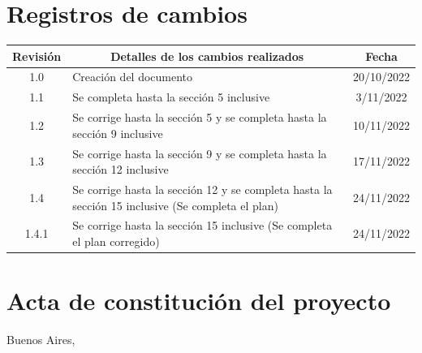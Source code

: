 \documentclass[
11pt, %
]{charter}
\begin{document}
\maketitle
\thispagestyle{empty}
\pagebreak


\thispagestyle{empty}
{\setlength{\parskip}{0pt}
\tableofcontents{}
}
\pagebreak


\section*{Registros de cambios}
\label{sec:registro}


\begin{table}[ht]
\label{tab:registro}
\centering
\begin{tabularx}{\linewidth}{@{}|c|X|c|@{}}
\hline
\rowcolor[HTML]{C0C0C0} 
Revisión & \multicolumn{1}{c|}{\cellcolor[HTML]{C0C0C0}Detalles de los cambios realizados} & Fecha      \\ \hline

1.0		& Creación del documento												& 20/10/2022 \\ \hline
1.1		& Se completa hasta la sección 5 inclusive							& 3/11/2022 \\ \hline
1.2		& Se corrige hasta la sección 5 y se completa hasta la sección 9 inclusive							& 10/11/2022 \\ \hline
1.3		& Se corrige hasta la sección 9 y se completa hasta la sección 12 inclusive							& 17/11/2022 \\ \hline
1.4		& Se corrige hasta la sección 12 y se completa hasta la sección 15 inclusive (Se completa el plan)		& 24/11/2022 \\ \hline
1.4.1		& Se corrige hasta la sección 15 inclusive (Se completa el plan corregido)		& 24/11/2022 \\ \hline

\end{tabularx}
\end{table}

\pagebreak



\section*{Acta de constitución del proyecto}
\label{sec:acta}

\begin{flushright}
Buenos Aires, \fechaInicioName
\end{flushright}

\vspace{2cm}
\end{document}

